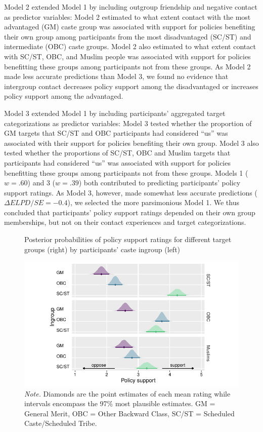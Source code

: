 \documentclass[12pt, a4paper]{article}
\begin{document}
Model 2 extended Model 1 by including outgroup friendship and negative contact as predictor variables: Model 2 estimated to what extent contact with the most advantaged (GM) caste group was associated with support for policies benefiting their own group among participants from the most disadvantaged (SC/ST) and intermediate (OBC) caste groups. Model 2 also estimated to what extent contact with SC/ST, OBC, and Muslim people was associated with support for policies benefitting these groups among participants not from these groups. As Model 2 made less accurate predictions than Model 3, we found no evidence that intergroup contact decreases policy support among the disadvantaged or increases policy support among the advantaged.

Model 3 extended Model 1 by including participants’ aggregated target categorizations as predictor variables: Model 3 tested whether the proportion of GM targets that SC/ST and OBC participants had considered “us” was associated with their support for policies benefiting their own group. Model 3 also tested whether the proportions of SC/ST, OBC and Muslim targets that participants had considered “us” was associated with support for policies benefitting these groups among participants not from these groups. Models 1 ($w = .60$) and 3 ($w = .39$) both contributed to predicting participants’ policy support ratings. As Model 3, however, made somewhat less accurate predictions ($\Delta\textit{ELPD}/\textit{SE} = -0.4$), we selected the more parsimonious Model 1. We thus concluded that participants’ policy support ratings depended on their own group memberships, but not on their contact experiences and target categorizations.

\begin{figure}
\caption{Posterior probabilities of policy support ratings for different target groups (right) by participants’ caste ingroup (left)}
\centering
\includegraphics[scale=1]{../figures/figure-6}
\caption*{\textit{Note.} Diamonds are the point estimates of each mean rating while intervals encompass the 97\% most plausible estimates. GM = General Merit, OBC = Other Backward Class, SC/ST = Scheduled Caste/Scheduled Tribe.}
\label{fig:f6}
\end{figure}
\end{document}
